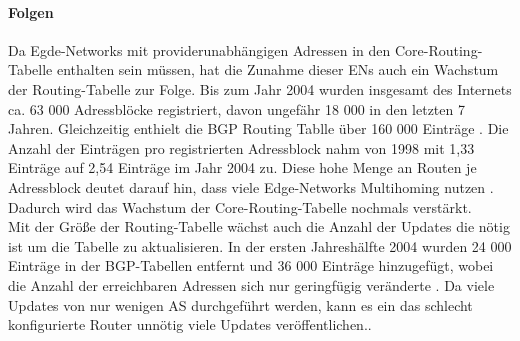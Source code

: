 \paragraph{Folgen}
Da Egde-Networks mit providerunabhängigen Adressen in den Core-Routing-Tabelle enthalten sein müssen, hat die Zunahme dieser ENs auch ein Wachstum der Routing-Tabelle zur Folge. Bis zum Jahr 2004 wurden insgesamt des Internets ca. 63 000 Adressblöcke registriert, davon ungefähr 18 000 in den letzten 7 Jahren. Gleichzeitig enthielt die BGP Routing Tablle über 160 000 Einträge \cite{journals/ccr/MengXZHLZ04}.  Die Anzahl der Einträgen pro registrierten Adressblock nahm von 1998 mit 1,33 Einträge auf 2,54 Einträge im Jahr 2004 zu. Diese hohe Menge an Routen je Adressblock deutet darauf hin, dass viele Edge-Networks Multihoming nutzen \cite{vogt:2008:six}. Dadurch wird das Wachstum der Core-Routing-Tabelle nochmals verstärkt.\\
Mit der Größe der Routing-Tabelle wächst auch die Anzahl der Updates die nötig ist um die Tabelle zu aktualisieren. In der ersten Jahreshälfte 2004 wurden 24 000 Einträge in der BGP-Tabellen entfernt und 36 000 Einträge hinzugefügt, wobei die Anzahl der erreichbaren Adressen sich nur geringfügig veränderte \cite{journals/ccr/MengXZHLZ04}. Da viele Updates von nur wenigen AS durchgeführt werden, kann es ein das schlecht konfigurierte Router unnötig viele Updates veröffentlichen.\cite{jen:2008:start}. \\

 


